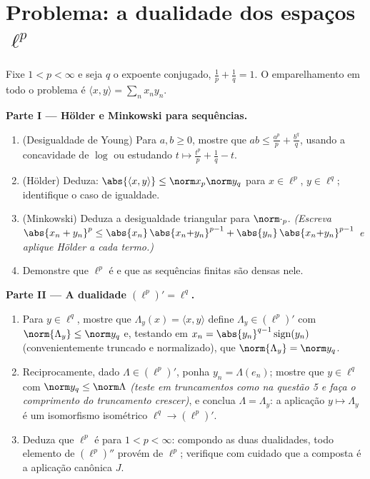 \section{Problema: a dualidade dos espaços
\texorpdfstring{$\ell^p$}%
{lp}}

\begin{problem}[{Problema de fim de semana --- $(\ell^p)' = \ell^q$, reflexividade e a
estranheza de $\ell^\infty$}]
\label{pb:b3:banach:1}
Fixe $1 < p < \infty$ e seja $q$ o expoente conjugado, $\frac1p + \frac1q = 1$. O emparelhamento
em todo o problema é $\langle x,
y\rangle = \sum_n x_ny_n$.

\medskip
\noindent\textbf{Parte I --- Hölder e Minkowski para sequências.}
\begin{enumerate}
  \item (Desigualdade de Young) Para $a, b \geq 0$, mostre que $ab \leq
        \frac{a^p}p + \frac{b^q}q$, usando a
        concavidade de $\log$ ou estudando $t \mapsto \frac{t^p}p + \frac1q - t$.
  \item (Hölder) Deduza: $\abs{\langle x, y\rangle} \leq
        \norm x_p\norm y_q$ para $x \in \ell^p$, $y \in \ell^q$; identifique o caso de
        igualdade.
  \item (Minkowski) Deduza a desigualdade triangular para $\norm\cdot_p$.
        \emph{(Escreva $\abs{x_n + y_n}^p \leq
        \abs{x_n}\,\abs{x_n{+}y_n}^{p-1} +
        \abs{y_n}\,\abs{x_n{+}y_n}^{p-1}$ e aplique Hölder a cada termo.)}
  \item Demonstre que $\ell^p$ é  e que as sequências
        finitas são densas nele.
\end{enumerate}

\medskip
\noindent\textbf{Parte II --- A dualidade $(\ell^p)' =
\ell^q$.}
\begin{enumerate}[resume]
  \item Para $y \in \ell^q$, mostre que $\Lambda_y(x) = \langle
        x, y\rangle$ define $\Lambda_y \in (\ell^p)'$ com $\norm{\Lambda_y} \leq \norm y_q$ e, testando em
        $x_n = \abs{y_n}^{q-1}\operatorname{sign}(y_n)$ (convenientemente truncado e normalizado), que $\norm{\Lambda_y} = \norm y_q$.
  \item Reciprocamente, dado $\Lambda \in (\ell^p)'$, ponha $y_n =
        \Lambda(e_n)$; mostre que $y \in \ell^q$ com
        $\norm y_q \leq
        \norm\Lambda$ \emph{(teste em truncamentos como na questão 5 e faça o
        comprimento do truncamento crescer)}, e conclua $\Lambda = \Lambda_y$: a
        aplicação $y \mapsto \Lambda_y$ é um isomorfismo isométrico $\ell^q \to (\ell^p)'$.
  \item Deduza que $\ell^p$ é \emph{} para $1 < p <
        \infty$: compondo
        as duas dualidades, todo elemento de $(\ell^p)''$ provém de
        $\ell^p$; verifique com cuidado que a composta é a
        aplicação canônica $J$.
\end{enumerate}


\end{problem}
